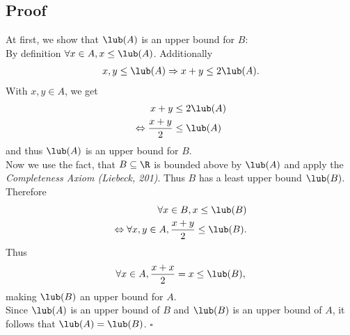 \documentclass{article}
\begin{document}
\subsection*{Proof}
At first, we show that $\lub(A)$ is an upper bound for $B$:\\
By definition $\forall x \in A, x \leq \lub(A)$. Additionally
\begin{align*}
  x,y\leq \lub(A) \Rightarrow x + y \leq 2\lub(A).
\end{align*}
With $x,y\in A$, we get
\begin{align*}
  x+y&\leq 2\lub(A)\\
  \Leftrightarrow\frac{x+y}{2}&\leq \lub(A)
\end{align*}
and thus $\lub(A)$ is an upper bound for $B$.\\
Now we use the fact, that $B\subseteq \R$ is bounded above by $\lub(A)$ and apply the \emph{Completeness Axiom (Liebeck, 201)}. Thus $B$ has a least upper bound $\lub(B)$. Therefore
\begin{align*}
  \forall x \in B, x \leq \lub(B)\\
  \Leftrightarrow \forall x, y \in A, \frac{x+y}{2}\leq \lub(B).
\end{align*}
Thus
\begin{align*}
  \forall x \in A, \frac{x+x}{2}=x \leq \lub(B),
\end{align*}
making $\lub(B)$ an upper bound for $A$.\\
Since $\lub(A)$ is an upper bound of $B$ and $\lub(B)$ is an upper bound of $A$, it follows that $\lub(A)=\lub(B)$. $\square$ 
\end{document}
